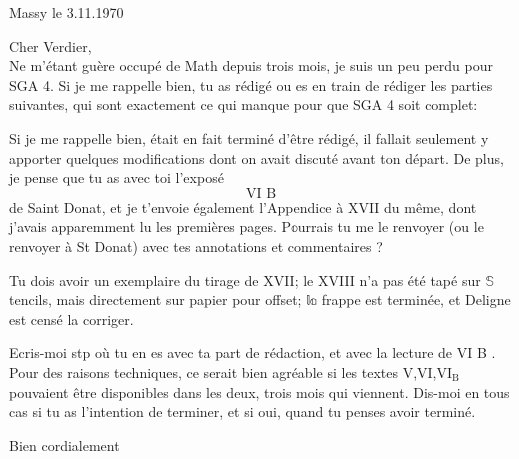\begin{flushright}
Massy le 3.11.1970\\
\end{flushright}
Cher Verdier,\\

Ne m'étant guère occupé de Math depuis trois mois, je suis un peu perdu pour SGA 4. Si je me rappelle bien, tu as rédigé ou es en train de rédiger les parties suivantes, qui sont exactement ce qui manque pour que SGA 4 soit complet:

Si je me rappelle bien,  était en fait terminé d'être rédigé, il fallait seulement y apporter quelques modifications dont on avait discuté avant ton départ. De plus, je pense que tu as avec toi l'exposé
\[
\text{VI B}
\]
de Saint Donat, et je t'envoie également l'Appendice à XVII du même, dont j'avais apparemment lu les premières pages. P\(\mathbb{o}\)urrais tu me le renvoyer (ou le renvoyer à St Donat) avec tes annotations et commentaires ?

Tu dois avoir un exemplaire du tirage de XVII; le XVIII n'a pas été tapé sur \(\mathbb{S}\)tencils, mais directement sur papier pour offset; \(\mathbb{la}\) frappe est terminée, et Deligne est censé la corriger.

Ecris-moi stp où tu en es avec ta part de rédaction, et avec la lecture de VI B .  Pour des raisons techniques, ce serait bien agréable si les textes V,VI,\(\mathrm{VI}_{\mathrm{B}}\) pouvaient être disponibles dans les deux, trois mois qui viennent. Dis-moi en tous cas si tu as l'intention de terminer, et si oui, quand tu penses avoir terminé.

Bien cordialement\\
